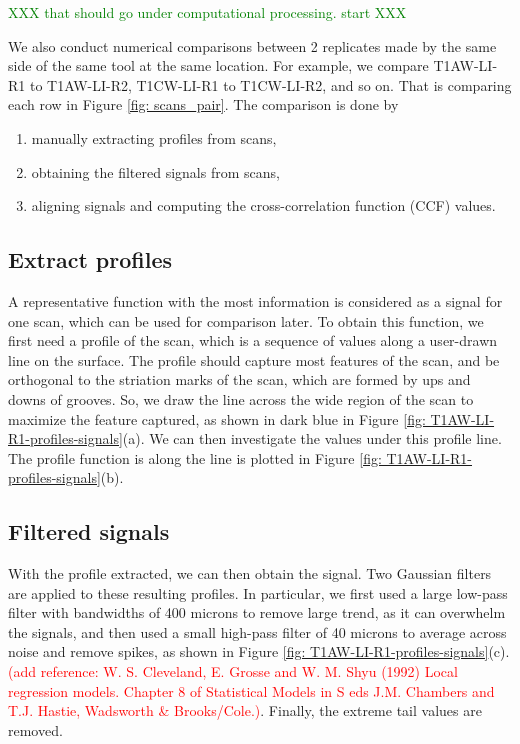 \documentclass[fleqn,10pt]{wlscirep}
\newcommand{\hh}[1]{{\textcolor{Green}{#1}}}
\begin{document}
\hh{XXX that should go under computational processing. start XXX}

We also conduct numerical comparisons between 2 replicates made by the
same side of the same tool at the same location. For example, we compare
T1AW-LI-R1 to T1AW-LI-R2, T1CW-LI-R1 to T1CW-LI-R2, and so on. That is
comparing each row in Figure \ref{fig: scans_pair}. The comparison is
done by

\begin{enumerate}
  \item
  manually extracting profiles from scans,

  \item
  obtaining the filtered signals from scans,
  
  \item
  aligning signals and computing the cross-correlation function (CCF) values.
\end{enumerate}

\subsection*{Extract profiles}

A representative function with the most information is considered as a
signal for one scan, which can be used for comparison later. To obtain
this function, we first need a profile of the scan, which is a sequence
of values along a user-drawn line on the surface. The profile should
capture most features of the scan, and be orthogonal to the striation
marks of the scan, which are formed by ups and downs of grooves. So, we
draw the line across the wide region of the scan to maximize the feature
captured, as shown in dark blue in Figure
\ref{fig: T1AW-LI-R1-profiles-signals}(a). We can then investigate the
values under this profile line. The profile function is along the line
is plotted in Figure \ref{fig: T1AW-LI-R1-profiles-signals}(b).

\subsection*{Filtered signals}

With the profile extracted, we can then obtain the signal. Two Gaussian
filters are applied to these resulting profiles. In particular, we first
used a large low-pass filter with bandwidths of 400 microns to remove
large trend, as it can overwhelm the signals, and then used a small
high-pass filter of 40 microns to average across noise and remove
spikes, as shown in Figure \ref{fig: T1AW-LI-R1-profiles-signals}(c).
\textcolor{red}{(add reference: W. S. Cleveland, E. Grosse and W. M. Shyu (1992) Local regression models. Chapter 8 of Statistical Models in S eds J.M. Chambers and T.J. Hastie, Wadsworth \& Brooks/Cole.)}.
Finally, the extreme tail values are removed.
\end{document}
